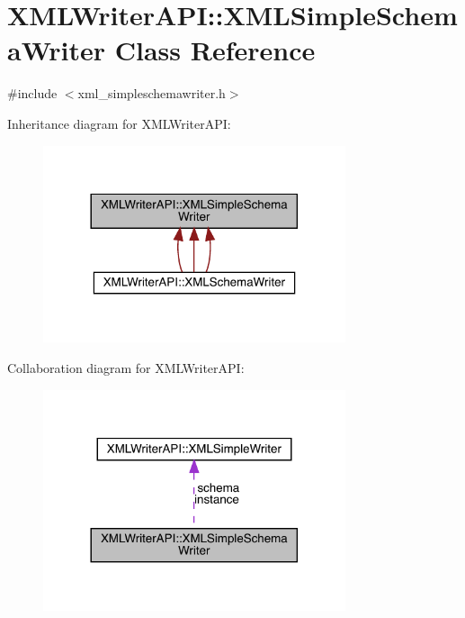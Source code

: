 \hypertarget{classXMLWriterAPI_1_1XMLSimpleSchemaWriter}{}\section{X\+M\+L\+Writer\+A\+PI\+:\+:X\+M\+L\+Simple\+Schema\+Writer Class Reference}
\label{classXMLWriterAPI_1_1XMLSimpleSchemaWriter}


{\ttfamily \#include $<$xml\+\_\+simpleschemawriter.\+h$>$}



Inheritance diagram for X\+M\+L\+Writer\+A\+PI\+:
\nopagebreak
\begin{figure}[H]
\begin{center}
\leavevmode
\includegraphics[width=252pt]{d6/d60/classXMLWriterAPI_1_1XMLSimpleSchemaWriter__inherit__graph}
\end{center}
\end{figure}


Collaboration diagram for X\+M\+L\+Writer\+A\+PI\+:\nopagebreak
\begin{figure}[H]
\begin{center}
\leavevmode
\includegraphics[width=252pt]{d0/dd0/classXMLWriterAPI_1_1XMLSimpleSchemaWriter__coll__graph}
\end{center}
\end{figure}
